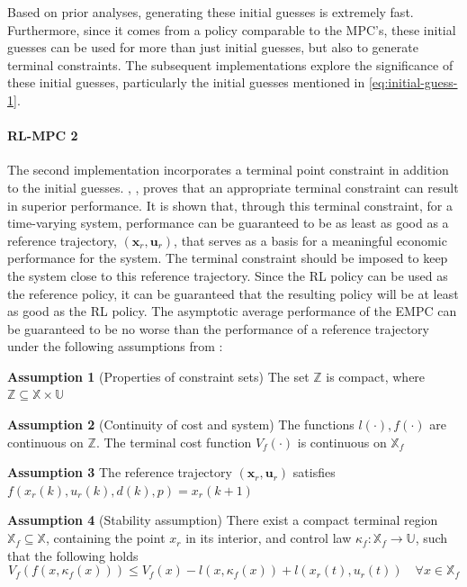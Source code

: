 Based on prior analyses, generating these initial guesses is extremely fast. Furthermore, since it comes from a policy comparable to the MPC’s, these initial guesses can be used for more than just initial guesses, but also to generate terminal constraints. The subsequent implementations explore the significance of these initial guesses, particularly the initial guesses mentioned in \autoref{eq:initial-guess-1}.

\paragraph{RL-MPC 2}
The second implementation incorporates a terminal point constraint in addition to the initial guesses. \citet{risbeckEconomicModelPredictive2020}, \citet{amritEconomicOptimizationUsing2011}, proves that an appropriate terminal constraint can result in superior performance. It is shown that, through this terminal constraint, for a time-varying system, performance can be guaranteed to be as least as good as a reference trajectory, $(\mathbf{x}_r, \mathbf{u}_r)$, that serves as a basis for a meaningful economic performance for the system. The terminal constraint should be imposed to keep the system close to this reference trajectory. Since the RL policy can be used as the reference policy, it can be guaranteed that the resulting policy will be at least as good as the RL policy. The asymptotic average performance of the EMPC can be guaranteed to be no worse than the performance of a reference trajectory under the following assumptions from \citet{amritEconomicOptimizationUsing2011,risbeckEconomicModelPredictive2020}:

\hspace{1cm} \textbf{Assumption 1} (Properties of constraint sets) The set $\mathbb{Z}$ is compact, where $\mathbb{Z} \subseteq \mathbb{X} \times \mathbb{U}$

\hspace{1cm} \textbf{Assumption 2}  (Continuity of cost and system) The functions $l(\cdot), f(\cdot)$ are continuous on $\mathbb{Z}$. The terminal cost function $V_f(\cdot)$ is continuous on $\mathbb{X}_f$ 

\hspace{1cm} \textbf{Assumption 3}  The reference trajectory $(\mathbf{x}_r, \mathbf{u}_r)$ satisfies $f(x_r(k),u_r(k),d(k),p)=x_r(k+1)$

\hspace{1cm} \textbf{Assumption 4} (Stability assumption) There exist a compact terminal region $\mathbb{X}_f \subseteq \mathbb{X}$, containing the point $x_r$ in its interior, and control law $\kappa_f : \mathbb{X}_f \rightarrow \mathbb{U}$, such that the following holds 
\begin{equation}\label{eq:assumption_3}
	V_f(f(x,\kappa_f(x))) \leq V_f(x) - l(x,\kappa_f(x)) + l(x_r(t),u_r(t)) \quad \forall x \in \mathbb{X}_f
\end{equation}

